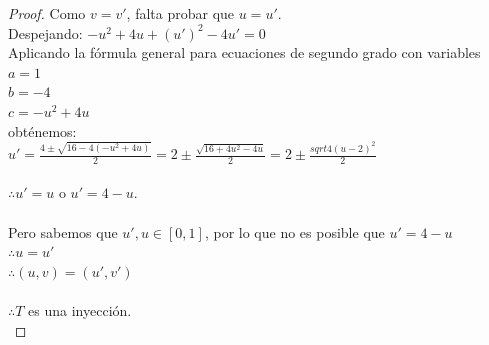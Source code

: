 \documentclass[10pt,letterpaper,fleqn]{article}
\begin{document}
\begin{enumerate}
\begin{proof}
        Como $v = v'$, falta probar que $u = u'$.\\
        Despejando: $-u^2 + 4u + (u')^2 - 4u' = 0$\\
        Aplicando la fórmula general para ecuaciones de segundo grado con variables\\
        $a = 1$\\
        $b = -4$\\
        $c = -u^2 + 4u$\\
        obténemos:\\
        $u' = \frac{4 \pm \sqrt{16 - 4(-u^2 + 4u)}}{2} = 2 \pm \frac{\sqrt{16 + 4 u^2 - 4u}}{2} = 2 \pm \frac{sqrt{4(u-2)^2}}{2}$\\\\
        $\therefore u' = u$ o $u' = 4 - u$.\\\\
        Pero sabemos que $u', u \in [0,1]$, por lo que no es posible que $u' = 4-u$\\
        $\therefore u = u'$\\
        $\therefore (u, v) = (u', v')$\\\\
        $\therefore T$ es una inyección.\\
		\end{proof} 
        

\end{enumerate}
\end{document}
